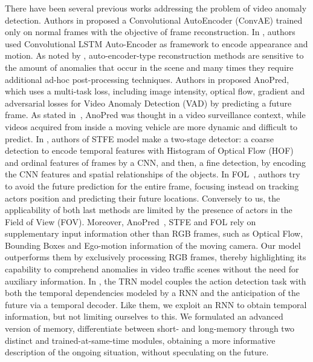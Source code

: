 There have been several previous works addressing the problem of video anomaly detection.
Authors in \cite{hasan2016learning} proposed a Convolutional AutoEncoder (ConvAE) trained only on normal frames with the objective of frame reconstruction.
In \cite{luo2017remembering,wang2018abnormal}, authors used Convolutional LSTM Auto-Encoder as framework to encode appearance and motion.
As noted by \cite{ramachandra2020survey}, auto-encoder-type reconstruction methods are sensitive to the amount of anomalies that occur in the scene and many times they require additional ad-hoc post-processing techniques.
Authors in \cite{liu2018future} proposed AnoPred, which uses a multi-task loss, including image intensity, optical flow, gradient and adversarial losses for Video Anomaly Detection (VAD) by predicting a future frame.
As stated in~\cite{9712446}, AnoPred was thought in a video surveillance context, while videos acquired from inside a moving vehicle are more dynamic and difficult to predict.
In \cite{zhou_spatio-temporal_2022}, authors of STFE model make a two-stage detector: a coarse detection to encode temporal features with Histogram of Optical Flow (HOF) \cite{wang2013action} and ordinal features of frames by a CNN, and then, a fine detection, by encoding the CNN features and spatial relationships of the objects.
In FOL~\cite{9712446}, authors try to avoid the future prediction for the entire frame, focusing instead on tracking actors position and predicting their future locations.
Conversely to us, the applicability of both last methods are limited by the presence of actors in the Field of View (FOV).
Moreover, AnoPred~\cite{liu2018future}, STFE \cite{zhou_spatio-temporal_2022} and FOL \cite{9712446} rely on supplementary input information other than RGB frames, such as Optical Flow, Bounding Boxes and Ego-motion information of the moving camera.
Our model outperforms them by exclusively processing RGB frames, thereby highlighting its capability to comprehend anomalies in video traffic scenes without the need for auxiliary information.
In \cite{xu2019temporal}, the TRN model couples the action detection task with both the temporal dependencies modeled by a RNN and the anticipation of the future via a temporal decoder.
Like them, we exploit an RNN to obtain temporal information, but not limiting ourselves to this.
We formulated an advanced version of memory, differentiate between short- and long-memory through two distinct and trained-at-same-time modules, obtaining a more informative description of the ongoing situation, without speculating on the future.
